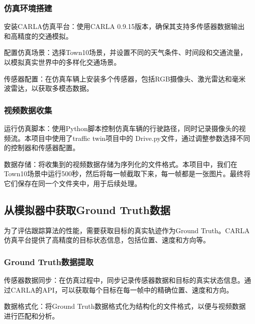 \subsubsection{仿真环境搭建}

安装CARLA仿真平台：使用CARLA 0.9.15版本，确保其支持多传感器数据输出和高精度的交通模拟。

配置仿真场景：选择Town10场景，并设置不同的天气条件、时间段和交通流量，以模拟真实世界中的多样化交通场景。

传感器配置：在仿真车辆上安装多个传感器，包括RGB摄像头、激光雷达和毫米波雷达，以获取多模态数据\cite{chu2021trt}。

\subsubsection{视频数据收集}

运行仿真脚本：使用Python脚本控制仿真车辆的行驶路径，同时记录摄像头的视频流。本项目中使用了traffic twin项目中的 Drive.py文件，通过调整参数选择不同的控制器和传感器配置。

数据存储：将收集到的视频数据存储为序列化的文件格式。本项目中，我们在Town10场景中运行500秒，然后将每一帧截取下来，每一帧都是一张图片。最终将它们保存在同一个文件夹中，用于后续处理。



\subsection{从模拟器中获取Ground Truth数据}

为了评估跟踪算法的性能，需要获取目标的真实轨迹作为Ground Truth。CARLA仿真平台提供了高精度的目标状态信息，包括位置、速度和方向等。


\subsubsection{Ground Truth数据提取}

传感器数据同步：在仿真过程中，同步记录传感器数据和目标的真实状态信息。通过CARLA的API，可以获取每个目标在每一帧中的精确位置、速度和方向。

数据格式化：将Ground Truth数据格式化为结构化的文件格式，以便与视频数据进行匹配和分析。





